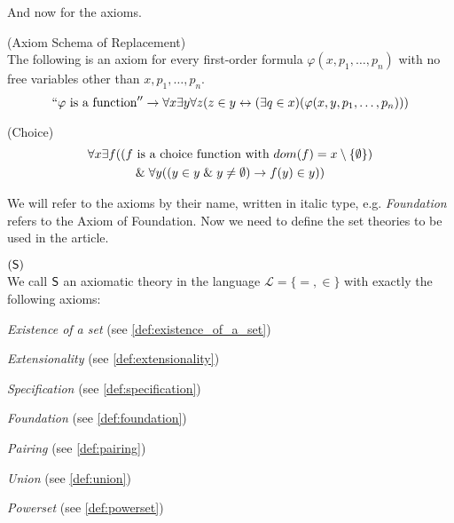 And now for the axioms.

\begin{definition}{(Axiom Schema of Replacement)}\label{def:replacement}\\
The following is an axiom for every first-order formula $\varphi(x, p_1, \ldots, p_n)$ with no free variables other than $x, p_1, \ldots, p_n$.
\begin{equation}
``\varphi\mbox{ is a function}''\rightarrow \forall x \exists y \forall z (z \in y \leftrightarrow (\exists q \in x)(\varphi(x, y, p_1, \ldots, p_n)))
\end{equation}
\end{definition}


\begin{definition}{(Choice)}\label{def:choice}\\
\begin{equation}
\begin{gathered}
\forall x \exists f ((f \mbox{ is a choice function with } dom(f) = x \setminus \{\emptyset\})\\
\mathrel{\&} \forall y ((y \in y \mathrel{\&} y \neq \emptyset) \rightarrow f(y) \in y))
\end{gathered}
\end{equation}
\end{definition}

We will refer to the axioms by their name, written in italic type, e.g. \emph{Foundation} refers to the Axiom of Foundation. Now we need to define the set theories to be used in the article. 

\begin{definition}{$(\sf{S})$}\label{def:s}\\ %
We call $\sf{S}$ an axiomatic theory in the language $\mathscr{L} = \{=, \in\}$ with exactly the following axioms:
\bce[(i)]
\item \emph{Existence of a set} (see \ref{def:existence_of_a_set})
\item \emph{Extensionality} (see \ref{def:extensionality})
\item \emph{Specification} (see \ref{def:specification})
\item \emph{Foundation} (see \ref{def:foundation})
\item \emph{Pairing} (see \ref{def:pairing})
\item \emph{Union} (see \ref{def:union})
\item \emph{Powerset} (see \ref{def:powerset})
\ece
\end{definition}

